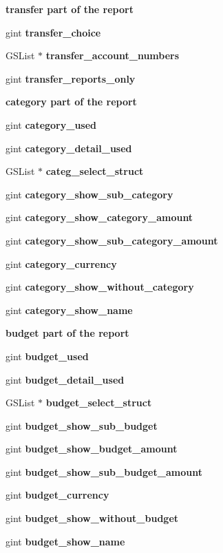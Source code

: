 \begin{Indent}{\bf transfer part of the report}\par
{\em \label{_amgrp11e29b40f240973533a72ed41e8f3c73}
 }\begin{DoxyCompactItemize}
\item 
gint {\bf transfer\_\-choice}
\item 
GSList $\ast$ {\bf transfer\_\-account\_\-numbers}
\item 
gint {\bf transfer\_\-reports\_\-only}
\end{DoxyCompactItemize}
\end{Indent}
\begin{Indent}{\bf category part of the report}\par
{\em \label{_amgrp1cfd9f5cb206244641a599959b038da1}
 }\begin{DoxyCompactItemize}
\item 
gint {\bf category\_\-used}
\item 
gint {\bf category\_\-detail\_\-used}
\item 
GSList $\ast$ {\bf categ\_\-select\_\-struct}
\item 
gint {\bf category\_\-show\_\-sub\_\-category}
\item 
gint {\bf category\_\-show\_\-category\_\-amount}
\item 
gint {\bf category\_\-show\_\-sub\_\-category\_\-amount}
\item 
gint {\bf category\_\-currency}
\item 
gint {\bf category\_\-show\_\-without\_\-category}
\item 
gint {\bf category\_\-show\_\-name}
\end{DoxyCompactItemize}
\end{Indent}
\begin{Indent}{\bf budget part of the report}\par
{\em \label{_amgrp8e80a44cebcdc905d85bff7be4a6ea1b}
 }\begin{DoxyCompactItemize}
\item 
gint {\bf budget\_\-used}
\item 
gint {\bf budget\_\-detail\_\-used}
\item 
GSList $\ast$ {\bf budget\_\-select\_\-struct}
\item 
gint {\bf budget\_\-show\_\-sub\_\-budget}
\item 
gint {\bf budget\_\-show\_\-budget\_\-amount}
\item 
gint {\bf budget\_\-show\_\-sub\_\-budget\_\-amount}
\item 
gint {\bf budget\_\-currency}
\item 
gint {\bf budget\_\-show\_\-without\_\-budget}
\item 
gint {\bf budget\_\-show\_\-name}
\end{DoxyCompactItemize}
\end{Indent}
